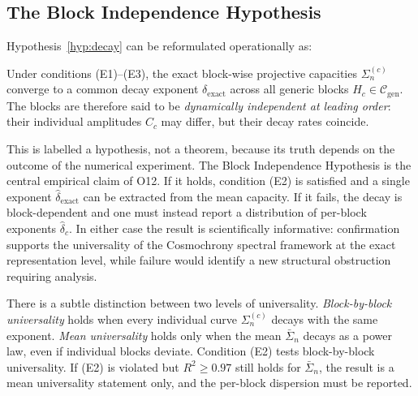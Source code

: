   \subsection{The Block Independence Hypothesis}
    \label{sec:bih}

    Hypothesis~\ref{hyp:decay} can be reformulated operationally as:

    \begin{hypothesis}
      \label{hyp:bih}
      Under conditions (E1)--(E3), the exact block-wise projective capacities $\Sigma_n^{(c)}$
      converge to a common decay exponent $\delta_{\mathrm{exact}}$ across all generic blocks
      $H_c\in\mathcal{C}_{\mathrm{gen}}$.
      The blocks are therefore said to be \emph{dynamically independent at leading order}:
      their individual amplitudes $C_c$ may differ, but their decay rates coincide.
    \end{hypothesis}

    This is labelled a hypothesis, not a theorem, because its truth depends on the
    outcome of the numerical experiment.
    The Block Independence Hypothesis is the central empirical claim of O12.
    If it holds, condition (E2) is satisfied and a single exponent $\hat{\delta}_{\mathrm{exact}}$
    can be extracted from the mean capacity.
    If it fails, the decay is block-dependent and one must instead report a distribution
    of per-block exponents $\hat{\delta}_c$.
    In either case the result is scientifically informative: confirmation supports the
    universality of the Cosmochrony spectral framework at the exact representation level,
    while failure would identify a new structural obstruction requiring analysis.

    \begin{remark}
      \label{rem:universality}
      There is a subtle distinction between two levels of universality.
      \emph{Block-by-block universality} holds when every individual curve $\Sigma_n^{(c)}$
      decays with the same exponent.
      \emph{Mean universality} holds only when the mean $\bar{\Sigma}_n$ decays as a power
      law, even if individual blocks deviate.
      Condition (E2) tests block-by-block universality.
      If (E2) is violated but $R^2\geq 0.97$ still holds for $\bar{\Sigma}_n$, the result
      is a mean universality statement only, and the per-block dispersion must be reported.
    \end{remark}

